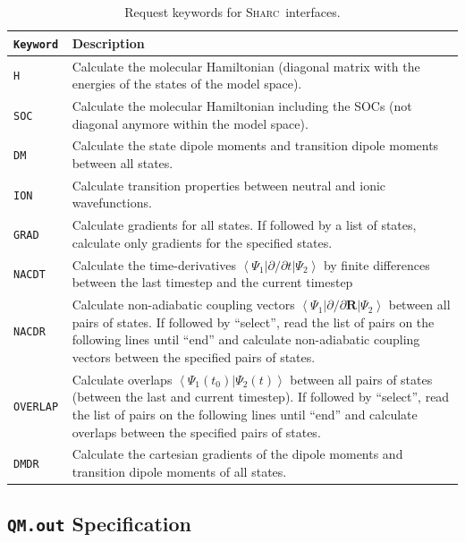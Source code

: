 \documentclass[a4paper,11pt,DIV=15,openany,twoside=false]{scrbook}
\newcommand{\sharc}{\textsc{Sharc}}
\newcommand{\ttt}[1]{\textbf{\texttt{#1}}}
\begin{document}
\begin{table}
  \centering
  \caption{Request keywords for \sharc\ interfaces.}
  \label{tab:int_req}
  \begin{tabular}{>{\tt}lp{12cm}}
  \toprule
  Keyword       &Description\\
  \midrule
  H               &Calculate the molecular Hamiltonian (diagonal matrix with the energies of the states of the model space).\\
  SOC             &Calculate the molecular Hamiltonian including the SOCs (not diagonal anymore within the model space).\\
  DM              &Calculate the state dipole moments and transition dipole moments between all states.\\
  ION             &Calculate transition properties between neutral and ionic wavefunctions.\\
  GRAD            &Calculate gradients for all states. If followed by a list of states, calculate only gradients for the specified states.\\
  NACDT           &Calculate the time-derivatives $\left\langle\Psi_1|\partial/\partial t|\Psi_2\right\rangle$ by finite differences between the last timestep and the current timestep\\
  NACDR           &Calculate non-adiabatic coupling vectors $\left\langle\Psi_1|\partial/\partial \mathbf{R}|\Psi_2\right\rangle$ between all pairs of states. If followed by ``select'', read the list of pairs on the following lines until ``end'' and calculate non-adiabatic coupling vectors between the specified pairs of states.\\
  OVERLAP         &Calculate overlaps $\left\langle\Psi_1(t_0)|\Psi_2(t)\right\rangle$ between all pairs of states (between the last and current timestep). If followed by ``select'', read the list of pairs on the following lines until ``end'' and calculate overlaps between the specified pairs of states.\\
  DMDR            &Calculate the cartesian gradients of the dipole moments and transition dipole moments of all states.\\
  \bottomrule
  \end{tabular}
\end{table}

\subsection{\ttt{QM.out} Specification}\label{intf:qmout}
\end{document}
